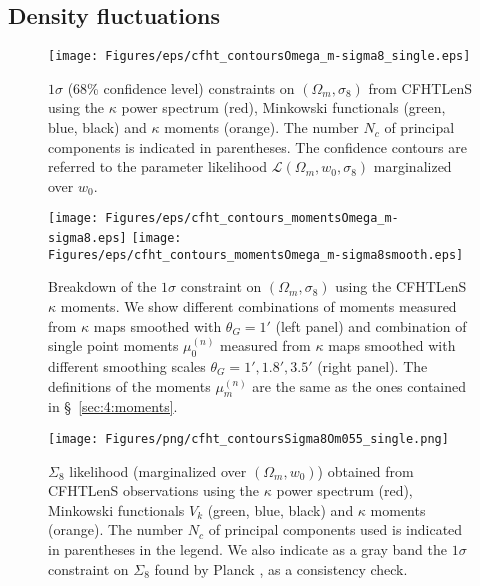 \subsection{Density fluctuations}
\label{sec:6:omsi8}
%
\begin{figure}
\begin{center}
\texttt{[image: Figures/eps/cfht\_contoursOmega\_m-sigma8\_single.eps]}
\end{center}
\caption{$1\sigma$ (68\% confidence level) constraints on $(\Omega_m,\sigma_8)$ from CFHTLenS using the $\kappa$ power spectrum (red), Minkowski functionals (green, blue, black) and $\kappa$ moments (orange). The number $N_c$ of principal components is indicated in parentheses. The confidence contours are referred to the parameter likelihood $\mathcal{L}(\Omega_m,w_0,\sigma_8)$ marginalized over $w_0$.}
\label{fig:6:cOmSisingle}
\end{figure}
%
\begin{figure}
\begin{center}
\texttt{[image: Figures/eps/cfht\_contours\_momentsOmega\_m-sigma8.eps]} \texttt{[image: Figures/eps/cfht\_contours\_momentsOmega\_m-sigma8smooth.eps]}
\end{center}
\caption{Breakdown of the $1\sigma$ constraint on $(\Omega_m,\sigma_8)$ using the CFHTLenS $\kappa$ moments. We show different combinations of moments measured from $\kappa$ maps smoothed with $\theta_G=1'$ (left panel) and combination of single point moments $\mu_0^{(n)}$ measured from $\kappa$ maps smoothed with different smoothing scales $\theta_G=1',1.8',3.5'$ (right panel). The definitions of the moments $\mu_m^{(n)}$ are the same as the ones contained in \S~\ref{sec:4:moments}.}
\label{fig:6:cOmSimoments}
\end{figure}
%
\begin{figure}
\begin{center}
\texttt{[image: Figures/png/cfht\_contoursSigma8Om055\_single.png]}
\end{center}
\caption{$\Sigma_8$ likelihood (marginalized over $(\Omega_m,w_0)$) obtained from CFHTLenS observations using the $\kappa$ power spectrum (red), Minkowski functionals $V_k$ (green, blue, black) and $\kappa$ moments (orange). The number $N_c$ of principal components used is indicated in parentheses in the legend. We also indicate as a gray band the $1\sigma$ constraint on $\Sigma_8$ found by Planck \citep{Planck15}, as a consistency check.}
\label{fig:6:cSi855}
\end{figure}
